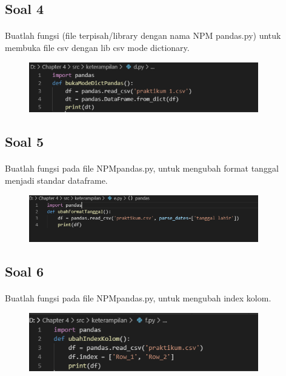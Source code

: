 \documentclass{article}
\begin{document}
    \subsection*{Soal 4}
        \paragraph{}Buatlah fungsi (file terpisah/library dengan nama NPM pandas.py) untuk membuka file csv dengan lib csv mode dictionary. 
         \begin{figure}[ht]
                \centerline{\includegraphics[width=10cm]{figure/d.PNG}}
            \end{figure}
        
    \subsection*{Soal 5}
        \paragraph{}Buatlah fungsi pada file NPMpandas.py, untuk mengubah format tanggal menjadi standar dataframe. 
        \begin{figure}[ht]
                \centerline{\includegraphics[width=10cm]{figure/e.PNG}}
            \end{figure}
    
    \subsection*{Soal 6}
        \paragraph{}Buatlah fungsi pada file NPMpandas.py, untuk mengubah index kolom. 
        \begin{figure}[ht]
                \centerline{\includegraphics[width=10cm]{figure/f.PNG}}
            \end{figure}
    
\end{document}
